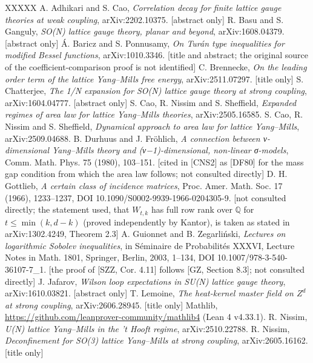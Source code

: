 \documentclass[11pt,a4paper]{article}
\theoremstyle{named}
\begin{document}
\begin{thebibliography}{XXXXX}
 A. Adhikari and S. Cao, \textit{Correlation decay for finite lattice gauge theories at weak coupling}, arXiv:2202.10375. [abstract only]
 R. Basu and S. Ganguly, \textit{SO(N) lattice gauge theory, planar and beyond}, arXiv:1608.04379. [abstract only]
 Á. Baricz and S. Ponnusamy, \textit{On Turán type inequalities for modified Bessel functions}, arXiv:1010.3346. [title and abstract; the original source of the coefficient-comparison proof is not identified]
 C. Brennecke, \textit{On the leading order term of the lattice Yang–Mills free energy}, arXiv:2511.07297. [title only]
 S. Chatterjee, \textit{The 1/N expansion for SO(N) lattice gauge theory at strong coupling}, arXiv:1604.04777. [abstract only]
 S. Cao, R. Nissim and S. Sheffield, \textit{Expanded regimes of area law for lattice Yang–Mills theories}, arXiv:2505.16585.
 S. Cao, R. Nissim and S. Sheffield, \textit{Dynamical approach to area law for lattice Yang–Mills}, arXiv:2509.04688.
 B. Durhuus and J. Fröhlich, \textit{A connection between ν-dimensional Yang–Mills theory and (ν−1)-dimensional, non-linear σ-models}, Comm. Math. Phys. 75 (1980), 103–151. [cited in [CNS2] as [DF80] for the mass gap condition from which the area law follows; not consulted directly]
 D. H. Gottlieb, \textit{A certain class of incidence matrices}, Proc. Amer. Math. Soc. 17 (1966), 1233–1237, DOI 10.1090/S0002-9939-1966-0204305-9. [not consulted directly; the statement used, that $W_{t,k}$ has full row rank over $\mathbb{Q}$ for $t \le \min(k, d-k)$ (proved independently by Kantor), is taken as stated in arXiv:1302.4249, Theorem 2.3]
 A. Guionnet and B. Zegarliński, \textit{Lectures on logarithmic Sobolev inequalities}, in Séminaire de Probabilités XXXVI, Lecture Notes in Math. 1801, Springer, Berlin, 2003, 1–134, DOI 10.1007/978-3-540-36107-7\_1. [the proof of [SZZ, Cor. 4.11] follows [GZ, Section 8.3]; not consulted directly]
 J. Jafarov, \textit{Wilson loop expectations in SU(N) lattice gauge theory}, arXiv:1610.03821. [abstract only]
 T. Lemoine, \textit{The heat-kernel master field on $Z^d$ at strong coupling}, arXiv:2606.28945. [title only]
 Mathlib, \url{https://github.com/leanprover-community/mathlib4} (Lean 4 v4.33.1).
 R. Nissim, \textit{U(N) lattice Yang–Mills in the 't Hooft regime}, arXiv:2510.22788.
 R. Nissim, \textit{Deconfinement for SO(3) lattice Yang–Mills at strong coupling}, arXiv:2605.16162. [title only]

\end{thebibliography}
\end{document}
